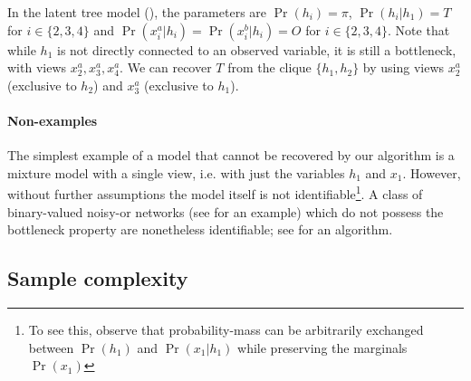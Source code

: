 In the latent tree model (), the parameters
are $\Pr(h_i) = \pi$, $\Pr(h_i | h_1) = T$ for $i \in \{2,3,4\}$
and $\Pr(x^a_i | h_i) = \Pr(x^b_i | h_i) = O$ for $i \in \{2,3,4\}$.
Note that while $h_1$ is not directly connected to an observed variable,
  it is still a bottleneck, with views $x^a_2, x^a_3, x^a_4$.
We can recover $T$ from the clique $\{h_1, h_2\}$ by using views $x^a_2$
  (exclusive to $h_2$) and $x^a_3$ (exclusive to $h_1$).


\paragraph{Non-examples}
\label{sec:non-example}

The simplest example of a model that cannot be recovered by our algorithm is
  a mixture model with a single view, i.e.  with
  just the variables $h_1$ and $x_1$.
However, without further assumptions the model itself is not
  identifiable\footnote{To see this, observe that probability-mass
  can be arbitrarily exchanged between $\Pr(h_1)$ and $\Pr(x_1 | h_1)$ while preserving the marginals $\Pr(x_1)$}.
A class of binary-valued noisy-or networks
(see  for an example)
which do not possess the
  bottleneck property are nonetheless identifiable;
  see \citet{halpern13noisyor} for an algorithm.

\subsection{Sample complexity}
\label{sec:sampleComplexity}

